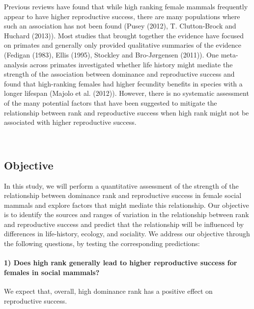 \documentclass[
]{article}
\begin{document}
Previous reviews have found that while high ranking female mammals
frequently appear to have higher reproductive success, there are many
populations where such an association has not been found (Pusey (2012),
T. Clutton-Brock and Huchard (2013)). Most studies that brought together
the evidence have focused on primates and generally only provided
qualitative summaries of the evidence (Fedigan (1983), Ellis (1995),
Stockley and Bro-Jørgensen (2011)). One meta-analysis across primates
investigated whether life history might mediate the strength of the
association between dominance and reproductive success and found that
high-ranking females had higher fecundity benefits in species with a
longer lifespan (Majolo et al. (2012)). However, there is no systematic
assessment of the many potential factors that have been suggested to
mitigate the relationship between rank and reproductive success when
high rank might not be associated with higher reproductive success.

~

\hypertarget{objective}{%
\subsection{Objective}\label{objective}}

In this study, we will perform a quantitative assessment of the strength
of the relationship between dominance rank and reproductive success in
female social mammals and explore factors that might mediate this
relationship. Our objective is to identify the sources and ranges of
variation in the relationship between rank and reproductive success and
predict that the relationship will be influenced by differences in
life-history, ecology, and sociality. We address our objective through
the following questions, by testing the corresponding predictions:

\hypertarget{does-high-rank-generally-lead-to-higher-reproductive-success-for-females-in-social-mammals}{%
\paragraph{\texorpdfstring{\textbf{1) Does high rank generally lead to
higher reproductive success for females in social
mammals?}}{1) Does high rank generally lead to higher reproductive success for females in social mammals?}}\label{does-high-rank-generally-lead-to-higher-reproductive-success-for-females-in-social-mammals}}

We expect that, overall, high dominance rank has a positive effect on
reproductive success.
\end{document}
